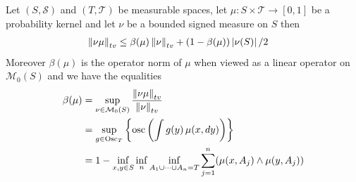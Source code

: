 \begin{prop}\label{TotalVariationContractionBound}Let $(S, \mathcal{S})$ and $(T, \mathcal{T})$ be measurable spaces, let $\mu : S
\times \mathcal{T} \to [0,1]$ be a probability kernel and let $\nu$ be a bounded signed measure on $S$ then 
\begin{align*}
\left \lVert  \nu \mu \right \rVert_{tv} &\leq \beta(\mu) \left \lVert  \nu \right \rVert_{tv} + (1 - \beta(\mu)) \left \vert \nu(S) \right \vert/2
\end{align*}
Moreover $\beta(\mu)$ is the operator norm of $\mu$ when viewed as a linear operator on $\mathcal{M}_0(S)$ and we have the equalities
\begin{align*}
\beta(\mu) &= \sup_{\nu \in \mathcal{M}_0(S) } \frac{\left \lVert  \nu \mu \right \rVert_{tv}}{\left \lVert  \nu \right \rVert_{tv}} \\
&= \sup_{g \in \operatorname*{Osc}_{T}} \left \lbrace \operatorname*{osc} \left( \int g(y) \, \mu(x, dy) \right) \right \rbrace \\
&=1 - \inf_{x, y \in S}  \inf_n \inf_{A_1 \cup \dotsb \cup A_n = T} \sum_{j=1}^n (\mu(x, A_j) \wedge \mu(y, A_j))
\end{align*}
\end{prop}
